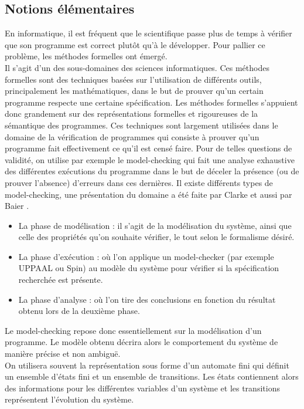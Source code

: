 \documentclass[12pt,a4paper,oneside]{book}
\theoremstyle{break}
\theoremstyle{breakplain}
\begin{document}
\subsection{Notions élémentaires}
En informatique, il est fréquent que le scientifique passe plus de temps à vérifier que son programme est correct plutôt qu'à le développer. Pour pallier ce problème, les méthodes formelles ont émergé.\\

Il s'agit d'un des sous-domaines des sciences informatiques. Ces méthodes formelles sont des techniques basées sur l'utilisation de différents outils, principalement les mathématiques, dans le but de prouver qu'un certain programme respecte une certaine spécification. Les méthodes formelles s'appuient donc grandement sur des représentations formelles et rigoureuses de la sémantique des programmes. Ces techniques sont largement utilisées dans le domaine de la vérification de programmes qui consiste à prouver qu'un programme fait effectivement ce qu'il est censé faire. Pour de telles questions de validité, on utilise par exemple le model-checking qui fait une analyse exhaustive des différentes exécutions du programme dans le but de déceler la présence (ou de prouver l'absence) d'erreurs dans ces dernières. Il existe différents types de model-checking, une présentation du domaine a été faite par Clarke \cite{clarke1999model} et aussi par Baier \cite{baier2008principles}.\\

\begin{itemize}
\item La phase de modélisation : il s'agit de la modélisation du système, ainsi que celle des propriétés qu'on souhaite vérifier, le tout selon le formalisme désiré.
\item La phase d'exécution : où l'on applique un model-checker (par exemple UPPAAL ou Spin) au modèle du système pour vérifier si la spécification recherchée est présente.
\item La phase d'analyse : où l'on tire des conclusions en fonction du résultat obtenu lors de la deuxième phase.
\end{itemize}

Le model-checking repose donc essentiellement sur la modélisation d'un programme. Le modèle obtenu décrira alors le comportement du système de manière précise et non ambiguë.\\

On utilisera souvent la représentation sous forme d'un automate fini qui définit un ensemble d'états fini et un ensemble de transitions. Les états contiennent alors des informations pour les différentes variables d'un système et les transitions représentent l'évolution du système.\\
\end{document}
